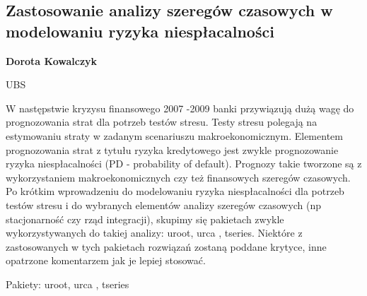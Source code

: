 \documentclass[\main/boa.tex]{subfiles}
\begin{document}
\subsection{Zastosowanie analizy szeregów czasowych w modelowaniu ryzyka niespłacalności}

\begin{minipage}{0.915\textwidth}
	\centering
  {\bf {} Dorota Kowalczyk}
\end{minipage}

\vskip 0.3cm

\begin{affiliations}
\begin{minipage}{0.915\textwidth}
\centering
UBS \\[-2pt]
\end{minipage}
\end{affiliations}

\vskip 0.8cm

 W następstwie kryzysu finansowego 2007 -2009 banki przywiązują dużą wagę do prognozowania strat dla potrzeb testów stresu. Testy stresu polegają na estymowaniu straty w zadanym scenariuszu makroekonomicznym. Elementem prognozowania strat z tytułu ryzyka kredytowego jest zwykle prognozowanie ryzyka niespłacalności (PD - probability of default). Prognozy takie tworzone są z wykorzystaniem makroekonomicznych czy też finansowych szeregów czasowych. Po krótkim wprowadzeniu do modelowaniu ryzyka niespłacalności dla potrzeb testów stresu i do wybranych elementów analizy szeregów czasowych (np stacjonarność czy rząd integracji), skupimy się pakietach zwykle wykorzystywanych do takiej analizy: uroot, urca , tseries. Niektóre z zastosowanych w tych pakietach rozwiązań zostaną poddane krytyce, inne opatrzone komentarzem jak je lepiej stosować.

Pakiety: uroot, urca , tseries
\end{document}
